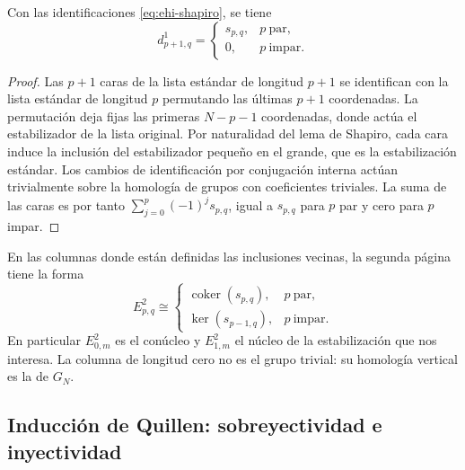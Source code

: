 \begin{lema}
\label{lem:ehi-d1}
Con las identificaciones \eqref{eq:ehi-shapiro}, se tiene
\begin{equation}
 d^1_{p+1,q}=\begin{cases}s_{p,q},&p\ \text{par},\\0,&p\ \text{impar}.\end{cases}
 \label{eq:ehi-d1}
\end{equation}
\end{lema}
\begin{proof}
Las $p+1$ caras de la lista estándar de longitud $p+1$ se identifican con la lista estándar de longitud $p$ permutando las últimas $p+1$ coordenadas. La permutación deja fijas las primeras $N-p-1$ coordenadas, donde actúa el estabilizador de la lista original. Por naturalidad del lema de Shapiro, cada cara induce la inclusión del estabilizador pequeño en el grande, que es la estabilización estándar. Los cambios de identificación por conjugación interna actúan trivialmente sobre la homología de grupos con coeficientes triviales. La suma de las caras es por tanto $\sum_{j=0}^p(-1)^j s_{p,q}$, igual a $s_{p,q}$ para $p$ par y cero para $p$ impar.
\end{proof}

En las columnas donde están definidas las inclusiones vecinas, la segunda página tiene la forma
\begin{equation}
 E^2_{p,q}\cong\begin{cases}
 \operatorname{coker}(s_{p,q}), & p\ \text{par},\\
 \ker(s_{p-1,q}), & p\ \text{impar}.
 \end{cases}
 \label{eq:ehi-e2}
\end{equation}
En particular $E^2_{0,m}$ es el conúcleo y $E^2_{1,m}$ el núcleo de la estabilización que nos interesa. La columna de longitud cero no es el grupo trivial: su homología vertical es la de $G_N$.

\subsection{Inducción de Quillen: sobreyectividad e inyectividad}


